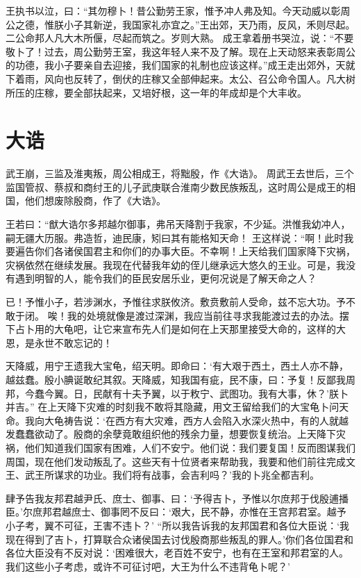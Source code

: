 \documentclass[a4paper,12pt,UTF8,twoside]{ctexbook}
\begin{document}
王执书以泣，曰：“其勿穆卜！昔公勤劳王家，惟予冲人弗及知。今天动威以彰周公之德，惟朕小子其新逆，我国家礼亦宜之。”王出郊，天乃雨，反风，禾则尽起。二公命邦人凡大木所偃，尽起而筑之。岁则大熟。
成王拿着册书哭泣，说：“不要敬卜了！过去，周公勤劳王室，我这年轻人来不及了解。现在上天动怒来表彰周公的功德，我小子要亲自去迎接，我们国家的礼制也应该这样。”成王走出郊外，天就下着雨，风向也反转了，倒伏的庄稼又全部伸起来。太公、召公命令国人。凡大树所压的庄稼，要全部扶起来，又培好根，这一年的年成却是个大丰收。

\chapter{大诰}

武王崩，三监及淮夷叛，周公相成王，将黜殷，作《大诰》。
周武王去世后，三个监国管叔、蔡叔和商纣王的儿子武庚联合淮南少数民族叛乱，这时周公是成王的相国，他们想废除殷商，作了《大诰》。

王若曰：“猷大诰尔多邦越尔御事，弗吊天降割于我家，不少延。洪惟我幼冲人，嗣无疆大历服。弗造哲，迪民康，矧曰其有能格知天命！
王这样说：“啊！此时我要遍告你们各诸侯国君主和你们的办事大臣。不幸啊！上天给我们国家降下灾祸，灾祸依然在继续发展。我现在代替我年幼的侄儿继承远大悠久的王业。可是，我没有遇到明智的人，能令我们的臣民安居乐业，更何况说是了解天命之人？

已！予惟小子，若涉渊水，予惟往求朕攸济。敷贲敷前人受命，兹不忘大功。予不敢于闭。
唉！我的处境就像是渡过深渊，我应当前往寻求我能渡过去的办法。摆下占卜用的大龟吧，让它来宣布先人们是如何在上天那里接受大命的，这样的大恩，是永世不敢忘记的！

天降威，用宁王遗我大宝龟，绍天明。即命曰：‘有大艰于西土，西土人亦不静，越兹蠢。殷小腆诞敢纪其叙。天降威，知我国有疵，民不康，曰：予复！反鄙我周邦，今蠢今翼。日，民献有十夫予翼，以于敉宁、武图功。我有大事，休？’朕卜并吉。”
在上天降下灾难的时刻我不敢将其隐藏，用文王留给我们的大宝龟卜问天命。我向大龟祷告说：‘在西方有大灾难，西方人会陷入水深火热中，有的人就越发蠢蠢欲动了。殷商的余孽竟敢组织他的残余力量，想要恢复统治。上天降下灾祸，他们知道我们国家有困难，人们不安宁。他们说：我们要复国！反而图谋我们周国，现在他们发动叛乱了。这些天有十位贤者来帮助我，我要和他们前往完成文王、武王所谋求的功业。我们将有战事，会吉利吗？’我的卜兆全都吉利。

肆予告我友邦君越尹氏、庶士、御事、曰：‘予得吉卜，予惟以尔庶邦于伐殷逋播臣。’尔庶邦君越庶士、御事罔不反曰：‘艰大，民不静，亦惟在王宫邦君室。越予小子考，翼不可征，王害不违卜？’
“所以我告诉我的友邦国君和各位大臣说：‘我现在得到了吉卜，打算联合众诸侯国去讨伐殷商那些叛乱的罪人。’你们各位国君和各位大臣没有不反对说：‘困难很大，老百姓不安宁，也有在王室和邦君室的人。我们这些小子考虑，或许不可征讨吧，大王为什么不违背龟卜呢？’
\end{document}
